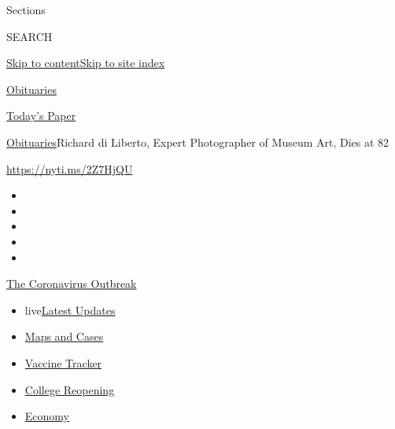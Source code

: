 Sections

SEARCH

\protect\hyperlink{site-content}{Skip to
content}\protect\hyperlink{site-index}{Skip to site index}

\href{https://www.nytimes.com/section/obituaries}{Obituaries}

\href{https://myaccount.nytimes.com/auth/login?response_type=cookie\&client_id=vi}{}

\href{https://www.nytimes.com/section/todayspaper}{Today's Paper}

\href{/section/obituaries}{Obituaries}\textbar{}Richard di Liberto,
Expert Photographer of Museum Art, Dies at 82

\url{https://nyti.ms/2Z7HjQU}

\begin{itemize}
\item
\item
\item
\item
\item
\end{itemize}

\href{https://www.nytimes.com/news-event/coronavirus?action=click\&pgtype=Article\&state=default\&region=TOP_BANNER\&context=storylines_menu}{The
Coronavirus Outbreak}

\begin{itemize}
\tightlist
\item
  live\href{https://www.nytimes.com/2020/08/03/world/coronavirus-covid-19.html?action=click\&pgtype=Article\&state=default\&region=TOP_BANNER\&context=storylines_menu}{Latest
  Updates}
\item
  \href{https://www.nytimes.com/interactive/2020/us/coronavirus-us-cases.html?action=click\&pgtype=Article\&state=default\&region=TOP_BANNER\&context=storylines_menu}{Maps
  and Cases}
\item
  \href{https://www.nytimes.com/interactive/2020/science/coronavirus-vaccine-tracker.html?action=click\&pgtype=Article\&state=default\&region=TOP_BANNER\&context=storylines_menu}{Vaccine
  Tracker}
\item
  \href{https://www.nytimes.com/2020/08/02/us/covid-college-reopening.html?action=click\&pgtype=Article\&state=default\&region=TOP_BANNER\&context=storylines_menu}{College
  Reopening}
\item
  \href{https://www.nytimes.com/live/2020/08/03/business/stock-market-today-coronavirus?action=click\&pgtype=Article\&state=default\&region=TOP_BANNER\&context=storylines_menu}{Economy}
\end{itemize}


